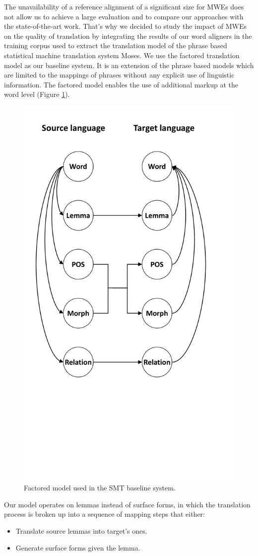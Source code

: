 \documentclass[output=paper,modfonts,nonflat]{langsci/langscibook}
\begin{document}
The unavailability of a reference alignment of a significant size for MWEs does not allow us to achieve a large evaluation and to compare our approaches with the state-of-the-art work. That's why we decided to study the impact of MWEs on the quality of translation by integrating the results of our word aligners in the training corpus used to extract the translation model of the phrase based statistical machine translation system Moses. We use the factored translation model \citep{koehn2007factored} as our baseline system. It is an extension of the phrase based models which are limited to the mappings of phrases without any explicit use of linguistic information.  The factored model enables the use of additional markup at the word level (Figure \ref{fig:factModel}).

\begin{figure}
\centering
\includegraphics[width=0.5\linewidth]{figures/Figure_FactTrans_NB}
\caption{\label{fig:factModel}Factored model used in the SMT baseline system.}
\end{figure}

Our model operates on lemmas instead of surface forms, in which the translation process is broken up into a sequence of mapping steps that either:
\begin{itemize}
\item Translate source lemmas into target's ones.
\item Generate surface forms given the lemma.
\end{itemize}
\end{document}
